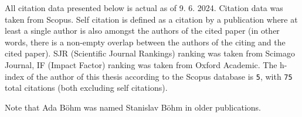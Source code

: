 All citation data presented below is actual as of 9. 6. 2024.
Citation data was taken from Scopus.
Self citation is defined as a citation by a publication where at least a single author is also amongst
the authors of the cited paper (in other words, there is a non-empty overlap between the authors of the citing and the cited paper).
SJR (Scientific Journal Rankings) ranking was taken from Scimago Journal,
IF (Impact Factor) ranking was taken from Oxford Academic.
The h-index of the author of this thesis according to the Scopus database is \texttt{5},
with \texttt{75} total citations (both excluding self citations).

Note that Ada Böhm was named Stanislav Böhm in older publications.

